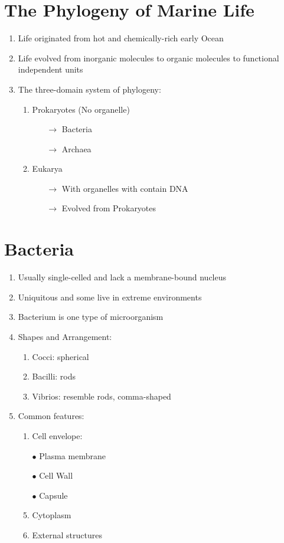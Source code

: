 \documentclass{report}
\begin{document}
\section{The Phylogeny of Marine Life}
\begin{enumerate}
    \item Life originated from hot and chemically-rich early Ocean
    \item Life evolved from inorganic molecules to organic molecules to functional independent units
    \item The three-domain system of phylogeny:
    \begin{enumerate}
        \item Prokaryotes (No organelle)
        \begin{enumerate}
            \item[$\rightarrow $]Bacteria
            \item[$\rightarrow$]Archaea  
        \end{enumerate}
        \item Eukarya
        \begin{enumerate}
            \item[$\rightarrow $]With organelles with contain DNA
            \item[$\rightarrow$]Evolved from Prokaryotes  
        \end{enumerate}
    \end{enumerate}
\end{enumerate}


\section{Bacteria}
\begin{enumerate}
    \item Usually single-celled and lack a membrane-bound nucleus
    \item Uniquitous and some live in extreme environments
    \item Bacterium is one type of microorganism
    \item Shapes and Arrangement:
    \begin{enumerate}
        \item Cocci: spherical
        \item Bacilli: rods 
        \item Vibrios: resemble rods, comma-shaped 
    \end{enumerate}
    \item Common features:
    \begin{enumerate}
        \item Cell envelope:
        \item [$\bullet$]Plasma membrane
        \item [$\bullet$]Cell Wall
        \item [$\bullet$]Capsule
        \item Cytoplasm
        \item External structures
    \end{enumerate}
\end{enumerate}
\end{document}
